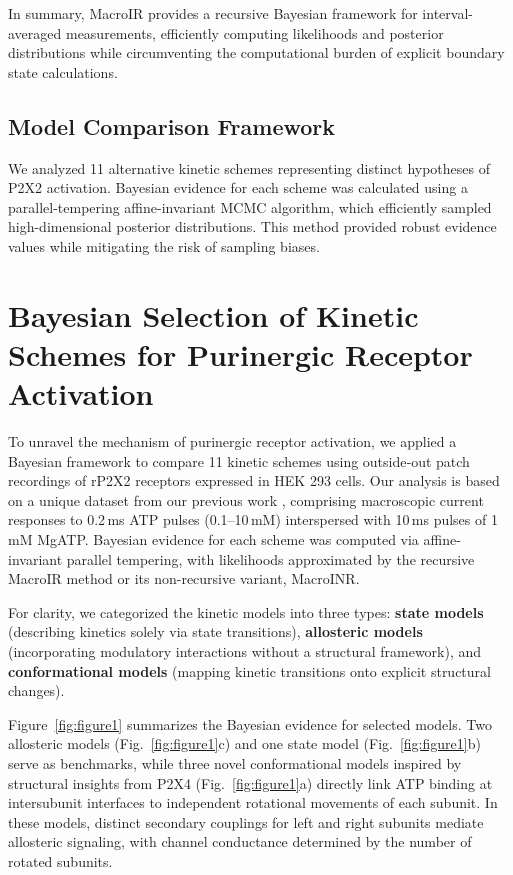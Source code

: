 \documentclass[pdflatex,sn-nature]{sn-jnl}%
\theoremstyle{thmstyleone}%
\theoremstyle{thmstyletwo}%
\theoremstyle{thmstylethree}%
\begin{document}
In summary, MacroIR provides a recursive Bayesian framework for interval-averaged measurements, efficiently computing likelihoods and posterior distributions while circumventing the computational burden of explicit boundary state calculations.
\subsection{Model Comparison Framework}
We analyzed 11 alternative kinetic schemes representing distinct hypotheses of P2X2 activation. Bayesian evidence for each scheme was calculated using a parallel-tempering affine-invariant MCMC algorithm, which efficiently sampled high-dimensional posterior distributions. This method provided robust evidence values while mitigating the risk of sampling biases. 


\section{Bayesian Selection of Kinetic Schemes for Purinergic Receptor Activation}

To unravel the mechanism of purinergic receptor activation, we applied a Bayesian framework to compare 11 kinetic schemes using outside‐out patch recordings of rP2X2 receptors expressed in HEK 293 cells. Our analysis is based on a unique dataset from our previous work \cite{Moffatt_hume}, comprising macroscopic current responses to 0.2\,ms ATP pulses (0.1–10\,mM) interspersed with 10\,ms pulses of 1\,mM MgATP. Bayesian evidence for each scheme was computed via affine-invariant parallel tempering, with likelihoods approximated by the recursive MacroIR method or its non-recursive variant, MacroINR.

For clarity, we categorized the kinetic models into three types: \textbf{state models} (describing kinetics solely via state transitions), \textbf{allosteric models} (incorporating modulatory interactions without a structural framework), and \textbf{conformational models} (mapping kinetic transitions onto explicit structural changes).

Figure~\ref{fig:figure1} summarizes the Bayesian evidence for selected models. Two allosteric models (Fig.~\ref{fig:figure1}c) and one state model (Fig.~\ref{fig:figure1}b) serve as benchmarks, while three novel conformational models inspired by structural insights from P2X4 (Fig.~\ref{fig:figure1}a) directly link ATP binding at intersubunit interfaces to independent rotational movements of each subunit. In these models, distinct secondary couplings for left and right subunits mediate allosteric signaling, with channel conductance determined by the number of rotated subunits.
\end{document}
